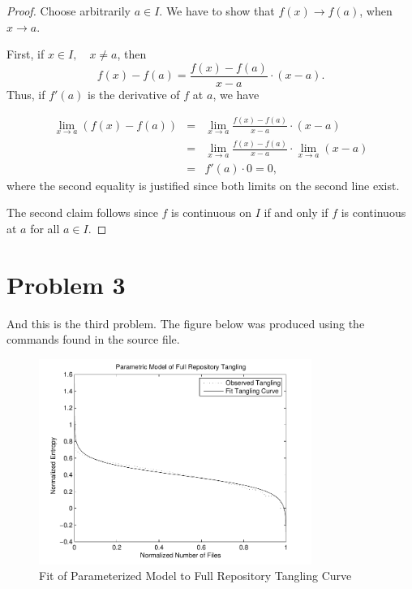 \documentclass[10pt,reqno,sumlimits]{amsart}
\theoremstyle{plain}
\theoremstyle{definition}
\newcommand{\1}{{\bf 1}}
\numberwithin{equation}{section}
\begin{document}
\begin{proof}
Choose arbitrarily $a\in I$. We have to show that $f(x)\to f(a)$, when $x\to a$.

First, if $x\in I, \quad x\neq a$, then
$$
f(x)-f(a) = \frac{f(x)-f(a)}{x-a}\cdot (x-a).
$$
Thus, if $f'(a)$ is the derivative of $f$ at $a$, we have

\begin{eqnarray}
\lim_{x \to a} (f(x) - f(a)) &=& \lim_{x \to a} \frac{f(x) - f(a)}{x-a} \cdot (x-a)\nonumber\\
&=& \lim_{x \to a} \frac{f(x) - f(a)}{x-a} \cdot \lim_{x \to a}(x-a)\nonumber\\
&=& f'(a) \cdot 0 = 0,\nonumber
\end{eqnarray}
where the second equality is justified since both limits on the second line exist.

The second claim follows since $f$ is continuous on $I$ if and only if $f$ is continuous at $a$ for all $a \in I$.

\end{proof}

\section{Problem 3}
And this is the third problem.  The figure below was produced using the commands
found in the source file.

\begin{figure}[htbp]
\centerline{
    \mbox{\includegraphics[width=3.5in]{curve_fit.pdf}}
  }
  \caption{Fit of Parameterized Model to Full Repository Tangling Curve}
  \label{fig:fit}
\end{figure}



  
\end{document}
